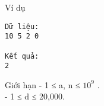 Ví dụ  
\begin{verbatim}
Dữ liệu:
10 5 2 0

Kết quả:
2
\end{verbatim}
   Giới hạn  
- 1 ≤ a, n ≤ $10^{9}$   .   
\\   - 1 ≤ d ≤ 20,000.